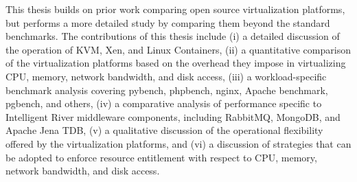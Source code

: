 This thesis builds on prior work comparing open source virtualization platforms, but performs a more detailed study by comparing them beyond the standard benchmarks. The contributions of this thesis include (i) a detailed discussion of the operation of KVM, Xen, and Linux Containers, (ii) a quantitative comparison of the virtualization platforms based on the overhead they impose in virtualizing CPU, memory, network bandwidth, and disk access, (iii) a workload-specific benchmark analysis covering pybench, phpbench, nginx, Apache benchmark, pgbench, and others, (iv) a comparative analysis of performance specific to Intelligent River\textsuperscript{\textregistered} middleware  components, including RabbitMQ, MongoDB, and Apache Jena TDB, (v) a qualitative discussion of the operational flexibility offered by the virtualization platforms, and (vi) a discussion of strategies that can be adopted to enforce resource entitlement with respect to CPU, memory, network bandwidth, and disk access.



%
%
%
%
%
%
%
%
%
%
%
%
%
%
%
%
%
%
%
%
%
%
%
%
%
%
 


